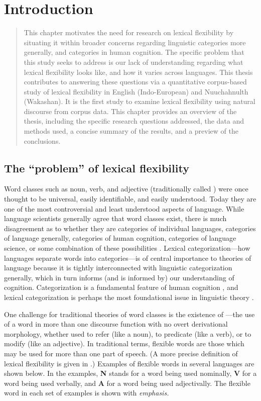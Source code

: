 \chapter{Introduction}
\label{ch:introduction}

\blockquote{This chapter motivates the need for research on lexical flexibility by situating it within broader concerns regarding linguistic categories more generally, and categories in human cognition. The specific problem that this study seeks to address is our lack of understanding regarding what lexical flexibility looks like, and how it varies across languages. This thesis contributes to answering these questions via a quantitative corpus-based study of lexical flexibility in English (Indo-European) and Nuuchahnulth (Wakashan). It is the first study to examine lexical flexibility using natural discourse from corpus data. This chapter provides an overview of the thesis, including the specific research questions addressed, the data and methods used, a concise summary of the results, and a preview of the conclusions.}

\section{The \enquote{problem} of lexical flexibility}
\label{sec:1.1}

Word classes such as noun, verb, and adjective (traditionally called ) were once thought to be universal, easily identifiable, and easily understood. Today they are one of the most controversial and least understood aspects of language. While language scientists generally agree that word classes exist, there is much disagreement as to whether they are categories of individual languages, categories of language generally, categories of human cognition, categories of language science, or some combination of these possibilities . Lexical categorization—how languages separate words into categories—is of central importance to theories of language because it is tightly interconnected with linguistic categorization generally, which in turn informs (and is informed by) our understanding of cognition. Categorization is a fundamental feature of human cognition , and lexical categorization is perhaps the most foundational issue in linguistic theory .

One challenge for traditional theories of word classes is the existence of —the use of a word in more than one discourse function with no overt derivational morphology, whether used to refer (like a noun), to predicate (like a verb), or to modify (like an adjective). In traditional terms, flexible words are those which may be used for more than one part of speech. (A more precise definition of lexical flexibility is given in .) Examples of flexible words in several languages are shown below. In the examples, \textbf{N} stands for a word being used nominally, \textbf{V} for a word being used verbally, and \textbf{A} for a word being used adjectivally. The flexible word in each set of examples is shown with \em{emphasis}.

